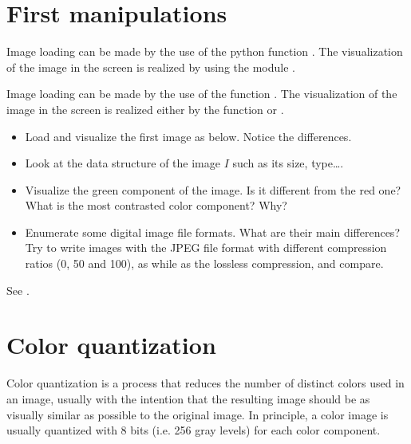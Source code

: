 \section{First manipulations}

\begin{pcomment}
\begin{premark}Image loading can be made by the use of the python function .
The visualization of the image in the screen is realized by using the module .
\end{premark}
\end{pcomment}

\begin{mcomment}
\begin{mremark}Image loading can be made by the use of the \matlabregistered{} function . 
The visualization of the image in the screen is realized either by the \matlabregistered{} function  or .
\end{mremark}
\end{mcomment}

\begin{qbox}
\begin{itemize}
\item Load and visualize the first image as below. Notice the differences.
 \item Look at the data structure of the image $I$ such as its size, type\dots.
\item Visualize the green component of the image.
Is it different from the red one? What is the most contrasted color component? Why? 
\item Enumerate some digital image file formats. 
What are their main differences? 
Try to write images with the JPEG file format with different compression ratios (0, 50 and 100), as while as the lossless compression, and compare.
\end{itemize}
\end{qbox}

\begin{mcomment}
 \begin{mremark}
  See .
 \end{mremark}
\end{mcomment}

\section{Color quantization}
Color quantization is a process that reduces the number of distinct colors used in an image, usually with the intention that the resulting image should be as visually similar as possible to the original image. In principle, a color image is usually quantized with 8 bits (i.e. 256 gray levels) for each color component.

